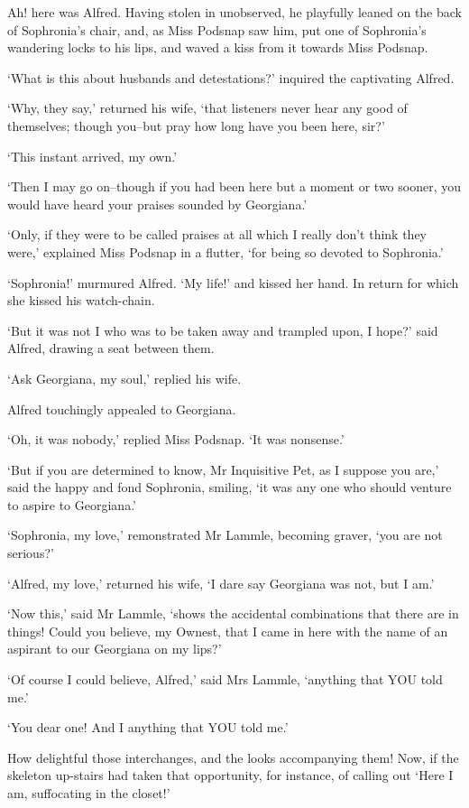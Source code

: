 Ah! here was Alfred. Having stolen in unobserved, he playfully leaned on
the back of Sophronia’s chair, and, as Miss Podsnap saw him, put one
of Sophronia’s wandering locks to his lips, and waved a kiss from it
towards Miss Podsnap.

‘What is this about husbands and detestations?’ inquired the captivating
Alfred.

‘Why, they say,’ returned his wife, ‘that listeners never hear any good
of themselves; though you--but pray how long have you been here, sir?’

‘This instant arrived, my own.’

‘Then I may go on--though if you had been here but a moment or two
sooner, you would have heard your praises sounded by Georgiana.’

‘Only, if they were to be called praises at all which I really don’t
think they were,’ explained Miss Podsnap in a flutter, ‘for being so
devoted to Sophronia.’

‘Sophronia!’ murmured Alfred. ‘My life!’ and kissed her hand. In return
for which she kissed his watch-chain.

‘But it was not I who was to be taken away and trampled upon, I hope?’
said Alfred, drawing a seat between them.

‘Ask Georgiana, my soul,’ replied his wife.

Alfred touchingly appealed to Georgiana.

‘Oh, it was nobody,’ replied Miss Podsnap. ‘It was nonsense.’

‘But if you are determined to know, Mr Inquisitive Pet, as I suppose you
are,’ said the happy and fond Sophronia, smiling, ‘it was any one who
should venture to aspire to Georgiana.’

‘Sophronia, my love,’ remonstrated Mr Lammle, becoming graver, ‘you are
not serious?’

‘Alfred, my love,’ returned his wife, ‘I dare say Georgiana was not, but
I am.’

‘Now this,’ said Mr Lammle, ‘shows the accidental combinations that
there are in things! Could you believe, my Ownest, that I came in here
with the name of an aspirant to our Georgiana on my lips?’

‘Of course I could believe, Alfred,’ said Mrs Lammle, ‘anything that YOU
told me.’

‘You dear one! And I anything that YOU told me.’

How delightful those interchanges, and the looks accompanying them! Now,
if the skeleton up-stairs had taken that opportunity, for instance, of
calling out ‘Here I am, suffocating in the closet!’

